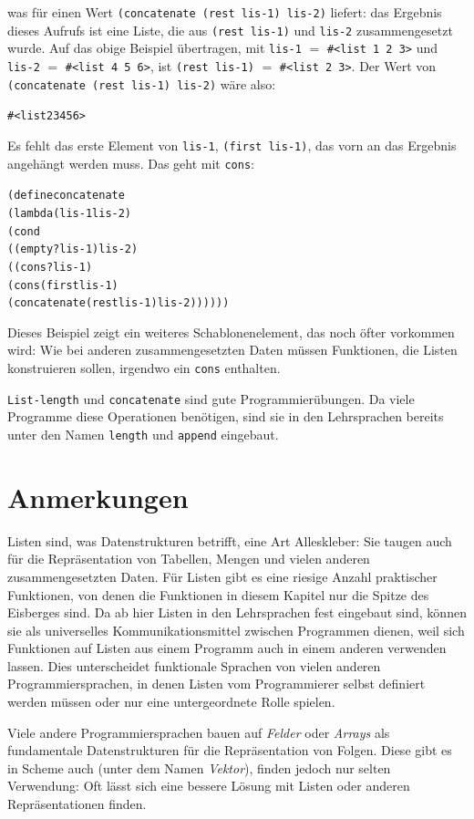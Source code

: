 was für einen Wert \texttt{(concatenate (rest lis-1) lis-2)} liefert: das Ergebnis
dieses Aufrufs ist eine
Liste, die aus \texttt{(rest lis-1)} und \texttt{lis-2} zusammengesetzt
wurde.  Auf das obige Beispiel übertragen, mit \texttt{lis-1} $=$
\verb|#<list 1 2 3>| und \texttt{lis-2} $=$
\verb|#<list 4 5 6>|, ist \texttt{(rest lis-1)} $=$ \verb|#<list 2 3>|.
Der Wert von \texttt{(concatenate (rest lis-1) lis-2)} wäre
also:
%
\begin{alltt}
#<list 2 3 4 5 6>
\end{alltt}
%
Es fehlt das erste Element von \texttt{lis-1}, \texttt{(first
  lis-1)}, das vorn an das Ergebnis angehängt werden muss.  Das geht
mit \texttt{cons}:
%
\begin{alltt}
(define concatenate
  (lambda (lis-1 lis-2)
    (cond
      ((empty? lis-1) lis-2)
      ((cons? lis-1) 
       (cons (first lis-1)
                  (concatenate (rest lis-1) lis-2))))))
\end{alltt}
%
Dieses Beispiel zeigt ein weiteres Schablonenelement, das noch öfter
vorkommen wird:  Wie bei anderen zusammengesetzten Daten müssen Funktionen, die
Listen konstruieren sollen, irgendwo ein \texttt{cons} enthalten.

\texttt{List-length} und \texttt{concatenate} sind gute
Programmierübungen.  Da viele Programme diese Operationen benötigen,
sind sie in den Lehrsprachen  bereits unter den Namen
\texttt{length} und
\texttt{append} eingebaut.


\section*{Anmerkungen}

Listen sind, was Datenstrukturen betrifft, eine Art Alleskleber:
Sie taugen auch für die Repräsentation von Tabellen,
Mengen und vielen anderen zusammengesetzten Daten.  Für Listen gibt es
eine riesige Anzahl praktischer Funktionen, von denen die Funktionen in
diesem Kapitel nur die Spitze des Eisberges sind.  Da 
ab hier Listen in den Lehrsprachen fest eingebaut sind, können sie als universelles
Kommunikationsmittel zwischen Programmen dienen, weil sich Funktionen
auf Listen aus einem Programm auch in einem anderen verwenden lassen.
Dies unterscheidet funktionale Sprachen von vielen anderen Programmiersprachen, in
denen Listen vom Programmierer selbst definiert werden müssen oder nur
eine untergeordnete Rolle spielen.

Viele andere Programmiersprachen bauen auf \textit{Felder} oder
\textit{Arrays} als fundamentale Datenstrukturen für die
Repräsentation von Folgen.  Diese gibt es in
Scheme auch (unter dem Namen \textit{Vektor}), finden jedoch
nur selten Verwendung: Oft lässt sich eine
bessere Lösung mit Listen oder anderen Repräsentationen finden.

